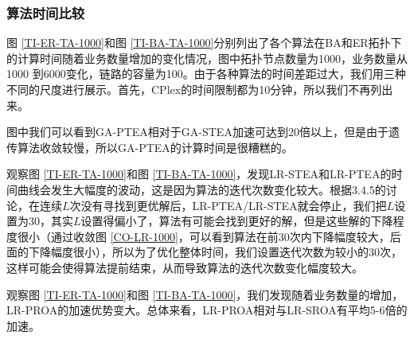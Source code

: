\subsubsection{算法时间比较}
图 \ref{TI-ER-TA-1000}和图 \ref{TI-BA-TA-1000}分别列出了各个算法在BA和ER拓扑下的计算时间随着业务数量增加的变化情况，图中拓扑节点数量为1000，业务数量从1000 到6000变化，链路的容量为100。由于各种算法的时间差距过大，我们用三种不同的尺度进行展示。首先，CPlex的时间限制都为10分钟，所以我们不再列出来。

图中我们可以看到GA-PTEA相对于GA-STEA加速可达到20倍以上，但是由于遗传算法收敛较慢，所以GA-PTEA的计算时间是很糟糕的。

观察图 \ref{TI-ER-TA-1000}和图 \ref{TI-BA-TA-1000}，发现LR-STEA和LR-PTEA的时间曲线会发生大幅度的波动，这是因为算法的迭代次数变化较大。根据3.4.5的讨论，在连续$L$次没有寻找到更优解后，LR-PTEA/LR-STEA就会停止，我们把$L$设置为30，其实$L$设置得偏小了，算法有可能会找到更好的解，但是这些解的下降程度很小（通过收敛图 \ref{CO-LR-1000}，可以看到算法在前30次内下降幅度较大，后面的下降幅度很小），所以为了优化整体时间，我们设置迭代次数为较小的30次，这样可能会使得算法提前结束，从而导致算法的迭代次数变化幅度较大。

观察图 \ref{TI-ER-TA-1000}和图 \ref{TI-BA-TA-1000}，我们发现随着业务数量的增加，LR-PROA的加速优势变大。总体来看，LR-PROA相对与LR-SROA有平均5-6倍的加速。

